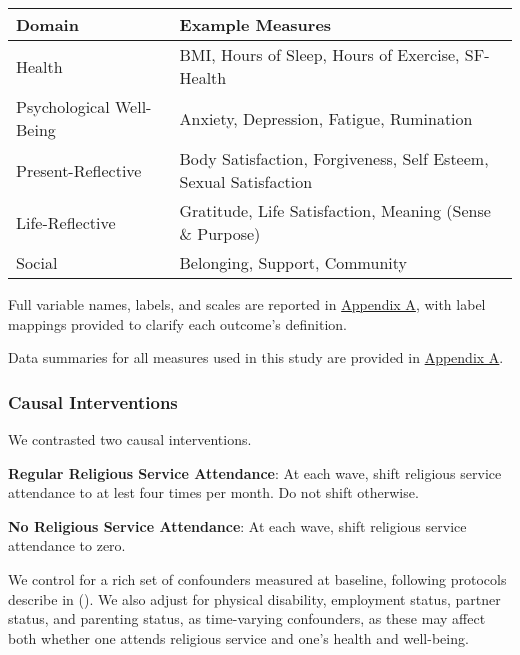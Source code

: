 \documentclass[
  single column]{article}
\begin{document}
\begin{longtable}[]{@{}
  >{\raggedright\arraybackslash}p{}
  >{\raggedright\arraybackslash}p{}@{}}
\toprule\noalign{}
\begin{minipage}[b]{\linewidth}\raggedright
Domain
\end{minipage} & \begin{minipage}[b]{\linewidth}\raggedright
Example Measures
\end{minipage} \\
\midrule\noalign{}
\endhead
\bottomrule\noalign{}
\endlastfoot
Health & BMI, Hours of Sleep, Hours of Exercise, SF-Health \\
Psychological Well-Being & Anxiety, Depression, Fatigue, Rumination \\
Present-Reflective & Body Satisfaction, Forgiveness, Self Esteem, Sexual
Satisfaction \\
Life-Reflective & Gratitude, Life Satisfaction, Meaning (Sense \&
Purpose) \\
Social & Belonging, Support, Community \\
\end{longtable}

Full variable names, labels, and scales are reported in
\href{appendix-measures}{Appendix A}, with label mappings provided to
clarify each outcome's definition.

Data summaries for all measures used in this study are provided in
\href{appendix-measures}{Appendix A}.

\subsubsection{Causal Interventions}\label{causal-interventions}

We contrasted two causal interventions.

\textbf{Regular Religious Service Attendance}: At each wave, shift
religious service attendance to at lest four times per month. Do not
shift otherwise.

\textbf{No Religious Service Attendance}: At each wave, shift religious
service attendance to zero.

We control for a rich set of confounders measured at baseline, following
protocols describe in (). We also adjust for physical disability, employment
status, partner status, and parenting status, as time-varying
confounders, as these may affect both whether one attends religious
service and one's health and well-being.
\end{document}
